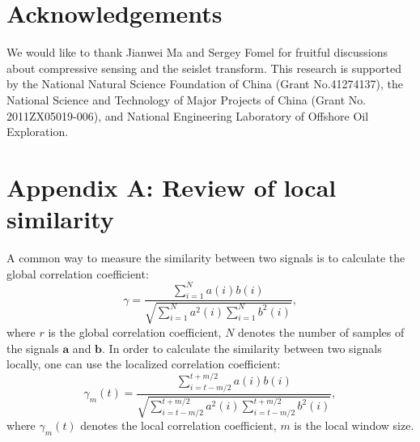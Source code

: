 \section*{Acknowledgements}
We would like to thank Jianwei Ma and Sergey Fomel for fruitful discussions about compressive sensing and the seislet transform.  This research is supported by the National Natural Science Foundation of China (Grant No.41274137), the National Science and Technology of Major Projects of China (Grant No. 2011ZX05019-006), and National Engineering Laboratory of Offshore Oil Exploration. 


\section{Appendix A: Review of local similarity}
A common way to measure the similarity between two signals is to calculate the global correlation coefficient:
\begin{equation}
\label{eq:simi}
\gamma=\frac{\displaystyle\sum_{i=1}^Na(i)b(i)}{\displaystyle\sqrt{\sum_{i=1}^Na^2(i)\sum_{i=1}^Nb^2(i)}},
\end{equation}
where $r$ is the global correlation coefficient, $N$ denotes the number of samples of the signals $\mathbf{a}$ and $\mathbf{b}$. In order to calculate the similarity between two signals locally, one can use the localized correlation coefficient:
\begin{equation}
\label{eq:simi}
\gamma_m(t)=\frac{\displaystyle\sum_{i=t-m/2}^{t+m/2} a(i) b(i)}{\sqrt{\displaystyle\sum_{i=t-m/2}^{t+m/2} a^2(i) \displaystyle\sum_{i=t-m/2}^{t+m/2} b^2(i) }},
\end{equation}
where $\gamma_m(t)$ denotes the local correlation coefficient, $m$ is the local window size.
\par
